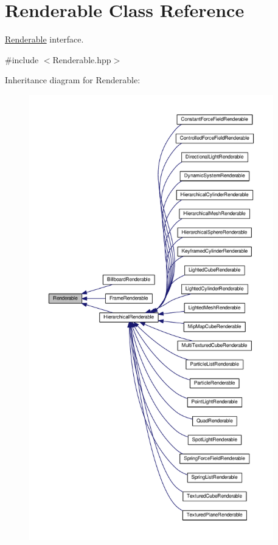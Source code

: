 \hypertarget{classRenderable}{\section{Renderable Class Reference}
\label{classRenderable}
}


\hyperlink{classRenderable}{Renderable} interface.  




{\ttfamily \#include $<$Renderable.\+hpp$>$}



Inheritance diagram for Renderable\+:\nopagebreak
\begin{figure}[H]
\begin{center}
\leavevmode
\includegraphics[height=550pt]{classRenderable__inherit__graph}
\end{center}
\end{figure}


